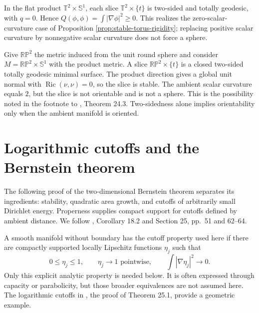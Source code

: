 \begin{example}\label{ex:flat-stable-torus}
In the flat product $\mathbb T^2\times\mathbb S^1$, each slice $\mathbb T^2\times\{t\}$ is two-sided and totally geodesic, with $q=0$. Hence $Q(\phi,\phi)=\int|\nabla\phi|^2\geq0$. This realizes the zero-scalar-curvature case of Proposition \ref{prop:stable-torus-rigidity}; replacing positive scalar curvature by nonnegative scalar curvature does not force a sphere.
\end{example}

\begin{example}\label{ex:stable-projective-plane}
Give $\mathbb{RP}^2$ the metric induced from the unit round sphere and consider $M=\mathbb{RP}^2\times\mathbb S^1$ with the product metric. A slice $\mathbb{RP}^2\times\{t\}$ is a closed two-sided totally geodesic minimal surface. The product direction gives a global unit normal with $\operatorname{Ric}(\nu,\nu)=0$, so the slice is stable. The ambient scalar curvature equals $2$, but the slice is not orientable and is not a sphere. This is the possibility noted in the footnote to \cite{ChMin}, Theorem 24.3. Two-sidedness alone implies orientability only when the ambient manifold is oriented.
\end{example}

\chapter{Logarithmic cutoffs and the Bernstein theorem}\label{sec:log-cutoffs-bernstein}
The following proof of the two-dimensional Bernstein theorem separates its ingredients: stability, quadratic area growth, and cutoffs of arbitrarily small Dirichlet energy. Properness supplies compact support for cutoffs defined by ambient distance. We follow \cite{ChMin}, Corollary 18.2 and Section 25, pp.~51 and 62--64.

\begin{definition}\label{def:zero-capacity-cutoffs}
A smooth manifold without boundary has the cutoff property used here if there are compactly supported locally Lipschitz functions $\eta_j$ such that
\[
 0\leq\eta_j\leq1,\qquad \eta_j\longrightarrow1\text{ pointwise},
 \qquad \int|\nabla\eta_j|^2\longrightarrow0.
\]
Only this explicit analytic property is needed below. It is often expressed through capacity or parabolicity, but those broader equivalences are not assumed here. The logarithmic cutoffs in \cite{ChMin}, the proof of Theorem 25.1, provide a geometric example.
\end{definition}

